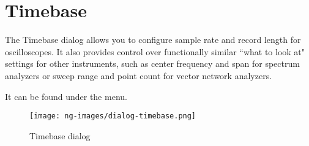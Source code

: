 \section{Timebase}
\label{dlg:timebase}

The Timebase dialog allows you to configure sample rate and record length for oscilloscopes. It also provides control
over functionally similar ``what to look at" settings for other instruments, such as center frequency and span for
spectrum analyzers or sweep range and point count for vector network analyzers.

It can be found under the  menu.

\begin{figure}[H]
\centering
\texttt{[image: ng-images/dialog-timebase.png]}
\caption{Timebase dialog}
\label{timebase}
\end{figure}
